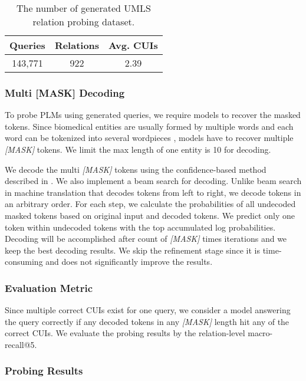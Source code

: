 \documentclass[11pt]{article}
\begin{document}
\begin{table}
\centering
\begin{tabular}{ccc}
\hline
Queries&Relations&Avg. CUIs\\
\hline
143,771&922&2.39\\
\hline
\end{tabular}
\caption{The number of generated UMLS relation probing dataset.}
\label{tab:umls}
\end{table}






\subsubsection{Multi [MASK] Decoding}
To probe PLMs using generated queries, we require models to recover the masked tokens.
Since biomedical entities are usually formed by multiple words and each word can be tokenized into several wordpieces \cite{wu2016google}, models have to recover multiple \textit{[MASK]} tokens.
We limit the max length of one entity is 10 for decoding.

We decode the multi \textit{[MASK]} tokens using the confidence-based method described in \citet{jiang-etal-2020-x}.
We also implement a beam search for decoding.
Unlike beam search in machine translation that decodes tokens from left to right, we decode tokens in an arbitrary order.
For each step, we calculate the probabilities of all undecoded masked tokens based on original input and decoded tokens.
We predict only one token within undecoded tokens with the top  accumulated log probabilities.
Decoding will be accomplished after count of \textit{[MASK]} times iterations and we keep the best  decoding results.
We skip the refinement stage since it is time-consuming and does not significantly improve the results.


\subsubsection{Evaluation Metric}

Since multiple correct CUIs exist for one query, we consider a model answering the query correctly if any decoded tokens in any \textit{[MASK]} length hit any of the correct CUIs.
We evaluate the probing results by the relation-level macro-recall@5.

\subsubsection{Probing Results}
\end{document}

